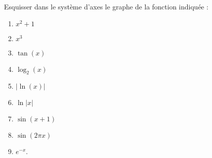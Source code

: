 \begin{exercice}\label{exoJanvier001}

Esquisser dans le système d'axes le graphe de la fonction indiquée :
\begin{enumerate}

\item
$x^2+1$

\item
$x^3$

\item
$\tan(x)$

\item
$\log_2(x)$

\item
$| \ln(x) |$

\item
$\ln| x |$

\item
$\sin(x+1)$

\item
$\sin(2\pi x)$

\item
$ e^{-x}$.

\end{enumerate}

\end{exercice}
